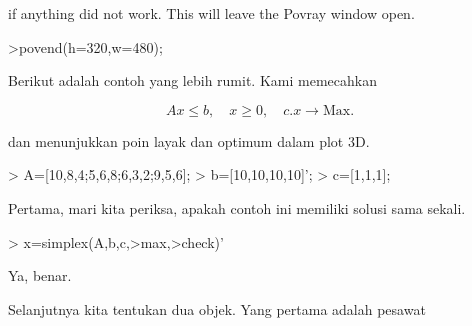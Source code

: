 \documentclass{report}
\begin{document}
\begin{eulernotebook}
\begin{eulercomment}
\begin{eulercomment}
\begin{eulercomment}
if anything did not work. This will leave the Povray window open.
\end{eulercomment}
\begin{eulerprompt}
>povend(h=320,w=480);
\end{eulerprompt}
\begin{eulercomment}
Berikut adalah contoh yang lebih rumit. Kami memecahkan

\end{eulercomment}
\begin{eulerformula}
\[
Ax \le b, \quad x \ge 0, \quad c.x \to \text{Max.}
\]
\end{eulerformula}
\begin{eulercomment}
dan menunjukkan poin layak dan optimum dalam plot 3D.
\end{eulercomment}
\begin{eulerprompt}
> A=[10,8,4;5,6,8;6,3,2;9,5,6];
> b=[10,10,10,10]';
> c=[1,1,1];
\end{eulerprompt}
\begin{eulercomment}
Pertama, mari kita periksa, apakah contoh ini memiliki solusi sama
sekali.
\end{eulercomment}
\begin{eulerprompt}
> x=simplex(A,b,c,>max,>check)'
\end{eulerprompt}
\begin{euleroutput}
  [0,  1,  0.5]
\end{euleroutput}
\begin{eulercomment}
Ya, benar.

Selanjutnya kita tentukan dua objek. Yang pertama adalah pesawat


\end{eulercomment}
\end{eulercomment}
\end{eulercomment}
\end{eulernotebook}
\end{document}

